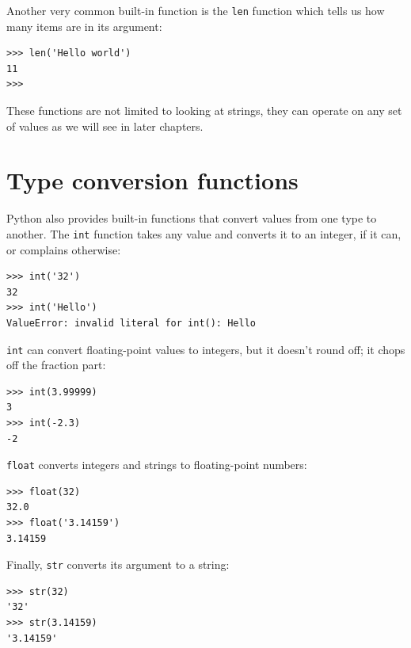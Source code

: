 \documentclass[10pt]{book}
\begin{document}
Another very common built-in function is the {\tt len} function
which tells us how many items are in its argument:

\beforeverb
\begin{verbatim}
>>> len('Hello world')
11
>>>
\end{verbatim}
\afterverb
%
These functions are not limited to looking at strings, they can operate
on any set of values as we will see in later chapters.

\section{Type conversion functions}



Python also provides built-in functions that convert values
from one type to another.  The {\tt int} function takes any value and
converts it to an integer, if it can, or complains otherwise:


\beforeverb
\begin{verbatim}
>>> int('32')
32
>>> int('Hello')
ValueError: invalid literal for int(): Hello
\end{verbatim}
\afterverb
%
{\tt int} can convert floating-point values to integers, but it
doesn't round off; it chops off the fraction part:

\beforeverb
\begin{verbatim}
>>> int(3.99999)
3
>>> int(-2.3)
-2
\end{verbatim}
\afterverb
%
{\tt float} converts integers and strings to floating-point
numbers:


\beforeverb
\begin{verbatim}
>>> float(32)
32.0
>>> float('3.14159')
3.14159
\end{verbatim}
\afterverb
%
Finally, {\tt str} converts its argument to a string:


\beforeverb
\begin{verbatim}
>>> str(32)
'32'
>>> str(3.14159)
'3.14159'
\end{verbatim}
\afterverb
%
\end{document}

